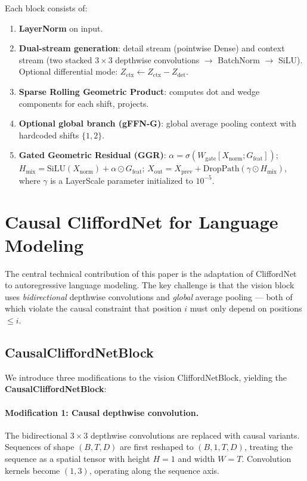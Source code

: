 \documentclass{article}
\newcommand{\silu}{\mathrm{SiLU}}
\newcommand{\sigmoid}{\sigma}
\begin{document}
Each block consists of:
\begin{enumerate}
  \item \textbf{LayerNorm} on input.
  \item \textbf{Dual-stream generation}: detail stream (pointwise Dense) and context stream (two stacked $3 \times 3$ depthwise convolutions $\to$ BatchNorm $\to$ SiLU). Optional differential mode: $Z_\text{ctx} \leftarrow Z_\text{ctx} - Z_\text{det}$.
  \item \textbf{Sparse Rolling Geometric Product}: computes dot and wedge components for each shift, projects.
  \item \textbf{Optional global branch (gFFN-G)}: global average pooling context with hardcoded shifts $\{1,2\}$.
  \item \textbf{Gated Geometric Residual (GGR)}: $\alpha = \sigmoid(W_\text{gate}[X_\text{norm}; G_\text{feat}])$; $H_\text{mix} = \silu(X_\text{norm}) + \alpha \odot G_\text{feat}$; $X_\text{out} = X_\text{prev} + \text{DropPath}(\gamma \odot H_\text{mix})$, where $\gamma$ is a LayerScale parameter initialized to $10^{-5}$.
\end{enumerate}

\section{Causal CliffordNet for Language Modeling}
\label{sec:causal}

The central technical contribution of this paper is the adaptation of CliffordNet to autoregressive language modeling.
The key challenge is that the vision block uses \emph{bidirectional} depthwise convolutions and \emph{global} average pooling --- both of which violate the causal constraint that position $i$ must only depend on positions $\le i$.

\subsection{CausalCliffordNetBlock}

We introduce three modifications to the vision CliffordNetBlock, yielding the \textbf{CausalCliffordNetBlock}:

\paragraph{Modification 1: Causal depthwise convolution.}
The bidirectional $3 \times 3$ depthwise convolutions are replaced with causal variants.
Sequences of shape $(B, T, D)$ are first reshaped to $(B, 1, T, D)$, treating the sequence as a spatial tensor with height $H{=}1$ and width $W{=}T$.
Convolution kernels become $(1, 3)$, operating along the sequence axis.
\end{document}
